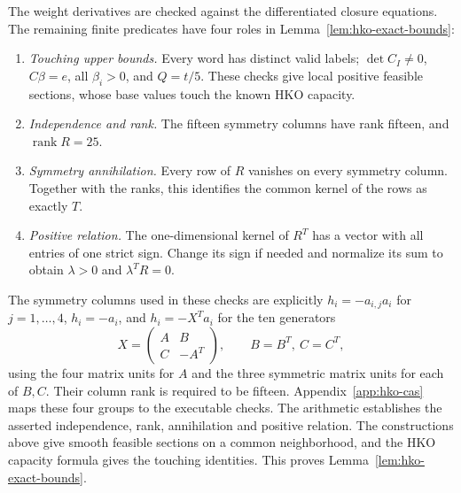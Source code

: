 The weight derivatives are checked against the differentiated closure
equations. The remaining finite predicates have four roles in
Lemma~\ref{lem:hko-exact-bounds}:
\begin{enumerate}
\item \emph{Touching upper bounds.} Every word has distinct valid labels;
  $\det C_I\ne0$, $C\beta=e$, all $\beta_i>0$, and $Q=t/5$.
  These checks give local positive feasible sections, whose base values
  touch the known HKO capacity.
\item \emph{Independence and rank.} The fifteen symmetry columns have
  rank fifteen, and $\operatorname{rank}R=25$.
\item \emph{Symmetry annihilation.} Every row of $R$ vanishes on every
  symmetry column. Together with the ranks, this identifies the common
  kernel of the rows as exactly $T$.
\item \emph{Positive relation.} The one-dimensional kernel of $R^T$ has
  a vector with all entries of one strict sign. Change its sign if needed
  and normalize its sum to obtain $\lambda>0$ and $\lambda^TR=0$.
\end{enumerate}
The symmetry columns used in these checks are explicitly
$h_i=-a_{i,j}a_i$ for $j=1,\ldots,4$,
$h_i=-a_i$, and $h_i=-X^Ta_i$ for the ten generators
\[
 X=\begin{pmatrix}A&B\\C&-A^T\end{pmatrix},\qquad B=B^T,\ C=C^T,
\]
using the four matrix units for $A$ and the three symmetric matrix units
for each of $B,C$. Their column rank is required to be fifteen.
Appendix~\ref{app:hko-cas} maps these four groups to the executable checks.
The arithmetic establishes the asserted independence, rank, annihilation and
positive relation. The constructions above give smooth feasible sections
on a common neighborhood, and the HKO capacity formula gives the touching
identities. This proves Lemma~\ref{lem:hko-exact-bounds}.
